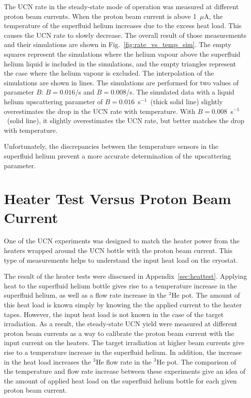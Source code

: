 The UCN rate in the steady-state mode of operation was measured at
different proton beam currents. When the proton beam current is above
1~$\mu$A, the temperature of the superfluid helium increases due to
the excess heat load. This causes the UCN rate to slowly decrease. The
overall result of those measurements and their simulations are shown
in Fig.~\ref{fig:rate_vs_temp_sim}. The empty squares represent the
simulations where the helium vapour above the superfluid helium liquid
is included in the simulations, and the empty triangles represent the
case where the helium vapour is excluded. The interpolation of the
simulations are shown in lines. The simulations are performed for two
values of parameter $B$: $B = 0.016$/s and $B = 0.008$/s. The
simulated data with a liquid helium upscattering parameter of
$B= 0.016$~s$^{-1}$~(thick solid line) slightly overestimates the drop
in the UCN rate with temperature. With $B= 0.008$~s$^{-1}$~(solid
line), it slightly overestimates the UCN rate, but better matches the
drop with temperature.

Unfortunately, the discrepancies between the temperature sensors in
the superfluid helium prevent a more accurate determination of the
upscattering parameter.

\section{Heater Test Versus Proton Beam Current}
One of the UCN experiments was designed to match the heater power from
the heaters wrapped around the UCN bottle with the proton beam
current. This type of measurements helps to understand the input heat
load on the cryostat.

The result of the heater tests were disscused in
Appendix~\ref{sec:heattest}. Applying heat to the superfluid helium
bottle gives rise to a temperature increase in the superfluid helium,
as well as a flow rate increase in the $^3$He pot. The amount of this
heat load is known simply by knowing the the applied current to the
heater tapes. However, the input heat load is not known in the case of
the target irradiation. As a result, the steady-state UCN yield were
measured at different proton beam currents as a way to calibrate the
proton beam current with the input current on the heaters. The target
irradiation at higher beam currents give rise to a temperature
increase in the superfluid helium. In addition, the increase in the
heat load increases the $^3$He flow rate in the $^3$He pot. The
comparison of the temperature and flow rate increase between these
experiments give an idea of the amount of applied heat load on the
superfluid helium bottle for each given proton beam current.

